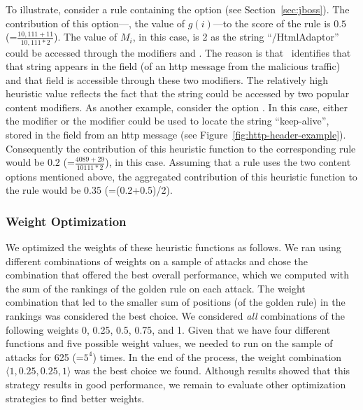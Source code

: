 \documentclass[sigconf,review, anonymous]{acmart}
\begin{document}
To illustrate, consider a rule containing the option
 (see Section~\ref{sec:jboss}). The
contribution of this option---\ie{}, the value of $\mathit{g(i)}$---to
the score of the rule is $0.5$ (=$\frac{10,111+11}{10,111*2}$). The
value of $M_i$, in this case, is 2 as the string ``/HtmlAdaptor''
could be accessed through the modifiers  and
. The reason is that \tname\ identifies that
that string appears in the field  (of an http
message from the malicious traffic) and that field is accessible
through these two modifiers. The relatively high heuristic value
reflects the fact that the string could be accessed by two popular
content modifiers.  As another example, consider the option
. In this case, either the modifier
 or the modifier  could be used to
locate the string ``keep-alive'', stored in the field
 from an http message (see
Figure~\ref{fig:http-header-example}). Consequently the contribution
of this heuristic function to the corresponding rule would be $0.2$
(=$\frac{4089+29}{10111*2}$), in this case. Assuming that a rule uses
the two content options mentioned above, the aggregated contribution
of this heuristic function to the rule would be 0.35 (=(0.2+0.5)/2).

\subsubsection{Weight Optimization}
\label{sec:weight-optimization}
We optimized the weights of these heuristic functions as follows. We
ran \tname{} using different combinations of weights on a sample of
attacks and chose the combination that offered the best overall
performance, which we computed with the sum of the rankings of the
golden rule on each attack. The weight combination that led to the
smaller sum of positions (of the golden rule) in the rankings was
considered the best choice. We considered \emph{all} combinations of
the following weights 0, 0.25, 0.5, 0.75, and 1. Given that we have
four different functions and five possible weight values, we needed to
run \tname{} on the sample of attacks for 625 (=$5^4$) times. In the
end of the process, the weight combination
$\langle{}1,0.25,0.25,1\rangle$ was the best choice we found. Although
results showed that this strategy results in good performance, we
remain to evaluate other optimization strategies to find better
weights.

 
\end{document}
